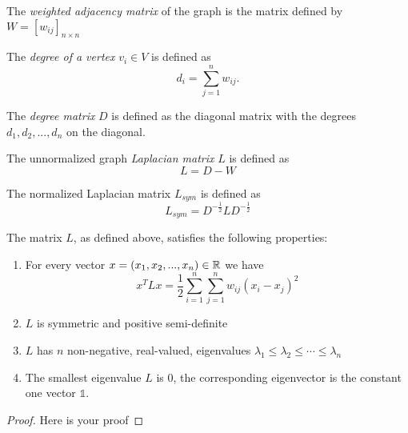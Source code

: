 	The \textit{weighted adjacency matrix} of the graph is the matrix defined by $W=[w_{ij}]_{n\times n}$
	
	The \textit{degree of a vertex} $v_i\in V$ is defined as 
	\begin{displaymath}
		d_i = \sum_{j=1}^n w_{ij}.
	\end{displaymath}
	
	The \textit{degree matrix} $D$ is defined as the diagonal matrix with the degrees $d_1, d_2, ..., d_n$ on the diagonal.
	
	The unnormalized graph \textit{Laplacian matrix} $L$ is defined as 
	\begin{displaymath}
		L = D - W
	\end{displaymath}
	
	The normalized Laplacian matrix $L_{sym}$ is defined as
	\begin{displaymath}
		L_{sym} = D^{-\frac{1}{2}}LD^{-\frac{1}{2}}
	\end{displaymath}
	
\begin{proposition}
	The matrix $L$, as defined above, satisfies the following properties:
	\begin{enumerate}
		\item For every vector $x=(x_1,x_2, ..., x_n)\in \mathbb{R}$ we have 
		\begin{displaymath}
			x^TLx = \frac{1}{2}\sum_{i=1}^n\sum_{j=1}^n w_{ij}\left(x_i-x_j\right)^2
		\end{displaymath}
		\item $L$ is symmetric and positive semi-definite
		\item $L$ has $n$ non-negative, real-valued, eigenvalues $\lambda_1 \leq \lambda_2 \leq \cdots \leq \lambda_n$
		\item The smallest eigenvalue $L$ is $0$, the corresponding eigenvector is the constant one vector $\mathbb 1$.
	\end{enumerate}
\end{proposition}
\begin{proof}
	Here is your proof
\end{proof}


